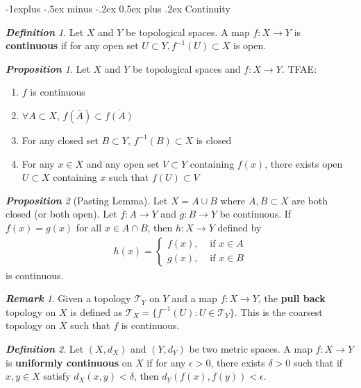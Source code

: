 \documentclass[frenchspacing,9pt,landscape,a4paper]{article}
\makeatletter
\renewcommand{\subsection}{\@startsection{subsection}{2}{0mm}%
                                {-1explus -.5ex minus -.2ex}%
                                {0.5ex plus .2ex}%
                                {\normalfont\normalsize\bfseries}}
\theoremstyle{remark}
\newtheorem*{defn}{\textbf{Definition}}
\newtheorem*{prop}{\textbf{Proposition}}
\newtheorem*{rem}{\textbf{Remark}}
\makeatother
\begin{document}
\begin{multicols}{4}
\subsection{Continuity}
\begin{defn}
    Let $X$ and  $Y$ be topological spaces. A map  $f:X\to Y$ is \textbf{continuous} if for any open set
    $U\subset Y,f^{-1}(U)\subset X$ is open.
\end{defn}
\begin{prop}
    Let $X$ and  $Y$ be topological spaces and  $f:X\to Y$. TFAE:
     \begin{enumerate}
         \item $f$ is continuous
         \item  $\forall A\subset X$,  $f(\overline{A})\subset\overline{f(A)}$
         \item For any closed set  $B\subset Y$,  $f^{-1}(B)\subset X$ is closed
         \item For any  $x\in X$ and any open set  $V\subset Y$ containing  $f(x)$, there exists open
             $U\subset X$ containing  $x$ such that  $f(U)\subset V$
    \end{enumerate}
\end{prop}
\begin{prop}[Pasting Lemma]
    Let $X=A\cup B$ where  $A,B\subset X$ are both closed (or both open). Let  $f:A\to Y$ and  $g:B\to Y$
    be continuous. If  $f(x)=g(x)$ for all  $x\in A\cap B$, then  $h:X\to Y$ defined by
    \begin{align*}
        h(x)=\begin{cases}
            f(x), & \text{ if } x\in A\\
            g(x), & \text{ if } x\in B
        \end{cases}
    \end{align*} is continuous.
\end{prop}
\begin{rem}
    Given a topology $\mathcal{T}_Y$ on  $Y$ and a map  $f:X\to Y$, the \textbf{pull back} topology on  $X$
    is defined as  $\mathcal{T}_X=\{f^{-1}(U):U\in\mathcal{T}_Y\}$. This is the coarsest topology on  $X$
    such that  $f$ is continuous.
\end{rem}
\begin{defn}
    Let $(X,d_X)$ and  $(Y,d_Y)$ be two metric spaces. A map  $f:X\to Y$ is \textbf{uniformly continuous}
    on  $X$ if for any  $\epsilon>0$, there exists  $\delta>0$ such that if  $x,y\in X$ satisfy
    $d_X(x,y)<\delta$, then  $d_Y(f(x),f(y))<\epsilon$.

\end{defn}
\end{multicols}
\end{document}

